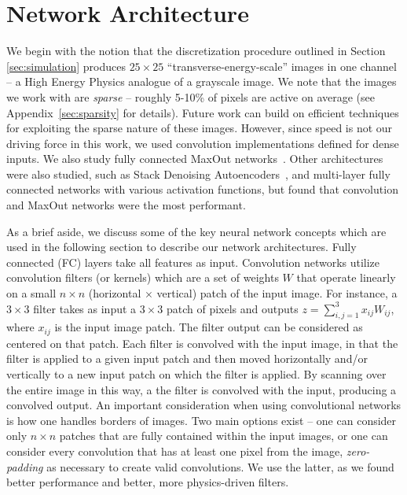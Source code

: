 
\section{Network Architecture}
\label{sec:arch}


We begin with the notion that the discretization procedure outlined in Section \ref{sec:simulation} produces $25\times 25$ ``transverse-energy-scale'' images in one channel -- a High Energy Physics analogue of a grayscale image. We note that the images we work with are \emph{sparse} -- roughly 5-10\% of pixels are active on average (see Appendix~\ref{sec:sparsity} for details). Future work can build on efficient techniques for exploiting the sparse nature of these images. However, since speed is not our driving force in this work, we used convolution implementations defined for dense inputs.  We also study fully connected MaxOut networks~\cite{maxout:goodfellow}.  Other architectures were also studied, such as Stack Denoising Autoencoders~\cite{SDAE}, and multi-layer fully connected networks with various activation functions, but found that convolution and MaxOut networks were the most performant.

As a brief aside, we discuss some of the key neural network concepts which are used in the following section to describe our network architectures.  Fully connected (FC) layers take all features as input.  Convolution networks utilize convolution filters (or kernels) which are a set of weights $W$ that operate linearly on a small $n\times n$ (horizontal $\times$ vertical) patch of the input image.  For instance, a $3\times3$ filter takes as input a $3\times3$ patch of pixels and outputs $z = \sum_{i,j=1}^{3} x_{ij}W_{ij}$, where $x_{ij}$ is the input image patch.  The filter output can be considered as centered on that patch.  Each filter is convolved with the input image, in that the filter is applied to a given input patch and then moved horizontally and/or vertically to a new input patch on which the filter is applied.  By scanning over the entire image in this way, a the filter is convolved with the input, producing a convolved output. An important consideration when using convolutional networks is how one handles borders of images. Two main options exist -- one can consider only $n\times n$ patches that are fully contained within the input images, or one can consider every convolution that has at least one pixel from the image, \emph{zero-padding} as necessary to create valid convolutions. We use the latter, as we found better performance and better, more physics-driven filters. 

